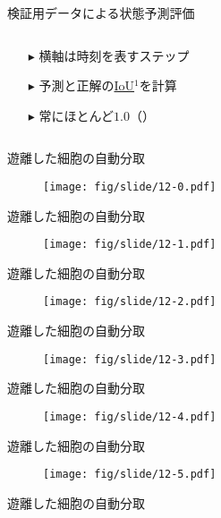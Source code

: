 \begin{frame}{検証用データによる状態予測評価}
\begin{columns}
\begin{column}{.4\linewidth}
\begin{itemize}
                \item[$\blacktriangleright$] 横軸は時刻を表すステップ
                \item[$\blacktriangleright$] 予測と正解の\uline{IoU}$^1$を計算
                \item[$\blacktriangleright$] 常にほとんど$1.0$（）
            \end{itemize}
        \end{column}
    \end{columns}
    \vspace{0.5zh}
\end{frame}

\begin{frame}{遊離した細胞の自動分取}
    \begin{figure}[t]
        \centering
        \texttt{[image: fig/slide/12-0.pdf]}
    \end{figure}
\end{frame}
\begin{frame}[noframenumbering]{遊離した細胞の自動分取}
    \begin{figure}[t]
        \centering
        \texttt{[image: fig/slide/12-1.pdf]}
    \end{figure}
\end{frame}
\begin{frame}[noframenumbering]{遊離した細胞の自動分取}
    \begin{figure}[t]
        \centering
        \texttt{[image: fig/slide/12-2.pdf]}
    \end{figure}
\end{frame}
\begin{frame}[noframenumbering]{遊離した細胞の自動分取}
    \begin{figure}[t]
        \centering
        \texttt{[image: fig/slide/12-3.pdf]}
    \end{figure}
\end{frame}
\begin{frame}[noframenumbering]{遊離した細胞の自動分取}
    \begin{figure}[t]
        \centering
        \texttt{[image: fig/slide/12-4.pdf]}
    \end{figure}
\end{frame}
\begin{frame}[noframenumbering]{遊離した細胞の自動分取}
    \begin{figure}[t]
        \centering
        \texttt{[image: fig/slide/12-5.pdf]}
    \end{figure}
\end{frame}
\begin{frame}[noframenumbering]{遊離した細胞の自動分取}
    \begin{figure}
    \end{figure}
\end{frame}
